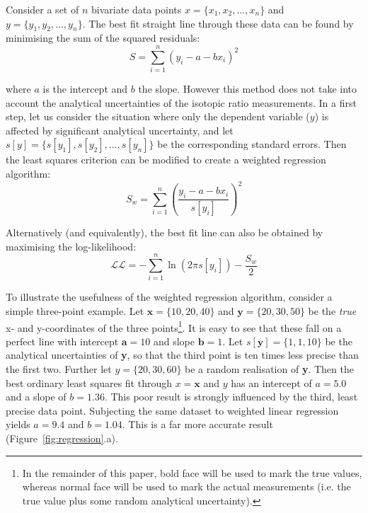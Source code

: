 \begin{refsection}
Consider a set of $n$ bivariate data points $x =
\{x_1,x_2,\ldots,x_n\}$ and $y = \{y_1,y_2,\ldots,y_n\}$.  The best
fit straight line through these data can be found by minimising the
sum of the squared residuals:
\begin{equation}
  S = \sum\limits_{i=1}^{n}\left( y_i - a - b x_i \right)^2
  \label{eq:S}
\end{equation}

\noindent where $a$ is the intercept and $b$ the slope. However this
method does not take into account the analytical uncertainties of the
isotopic ratio measurements. In a first step, let us consider the
situation where only the dependent variable ($y$) is affected by
significant analytical uncertainty, and let $s[y] =
\{s[y_1],s[y_2],\ldots,s[y_n]\}$ be the corresponding standard
errors. Then the least squares criterion can be modified to create a
weighted regression algorithm:
\begin{equation}
  S_w = \sum\limits_{i=1}^{n}\left( \frac{y_i - a - b x_i}{s[y_i]} \right)^2
  \label{eq:Swtd}
\end{equation}

Alternatively (and equivalently), the best fit line can also be
obtained by maximising the log-likelihood:
\begin{equation}
  \mathcal{LL} = - \sum\limits_{i=1}^{n} \ln\left(2 \pi s[y_i] \right)
  - \frac{S_w}{2}
  \label{eq:L}
\end{equation}

To illustrate the usefulness of the weighted regression algorithm,
consider a simple three-point example. Let $\boldsymbol{x} = \{10, 20,
40\}$ and $\boldsymbol{y} = \{20,30,50\}$ be the \emph{true} x- and
y-coordinates of the three points\footnote{In the remainder of this
  paper, bold face will be used to mark the true values, whereas
  normal face will be used to mark the actual measurements (i.e. the
  true value plus some random analytical uncertainty).}. It is easy to
see that these fall on a perfect line with intercept $\boldsymbol{a} =
10$ and slope $\boldsymbol{b} = 1$. Let $s[\boldsymbol{y}] =
\{1,1,10\}$ be the analytical uncertainties of \textbf{y}, so that the
third point is ten times less precise than the first two. Further let
$y = \{20,30,60\}$ be a random realisation of \textbf{y}.  Then the
best ordinary least squares fit through $x = \boldsymbol{x}$ and $y$
has an intercept of $a = 5.0$ and a slope of $b = 1.36$. This poor
result is strongly influenced by the third, least precise data
point. Subjecting the same dataset to weighted linear regression
yields $a = 9.4$ and $b = 1.04$. This is a far more accurate result
(Figure~\ref{fig:regression}.a).\\


\end{refsection}
